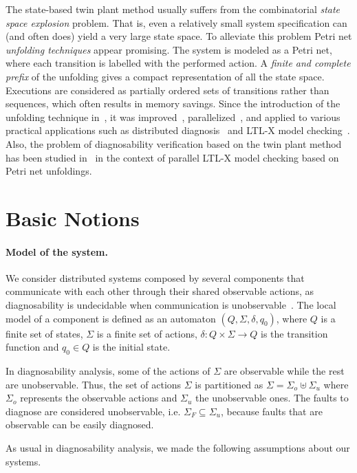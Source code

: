 \documentclass[a4paper]{article}
\begin{document}
The state-based twin plant method usually suffers from the combinatorial \emph{state space explosion} problem. That is, even a relatively small system specification can (and often does) yield a very large state space. To alleviate this problem Petri net \emph{unfolding techniques} appear promising. The system is modeled as a Petri net, where each transition is labelled with the performed action. A \emph{finite and complete prefix} of the unfolding gives a compact representation of all the state space. Executions are considered as partially ordered sets of transitions rather than sequences, which often results in memory savings. Since the introduction of the unfolding technique in~\cite{McMillan1992a}, it was improved~\cite{Esparza2002}, parallelized~\cite{Heljanko2002}, and applied to various practical applications such as distributed diagnosis~\cite{Fabre2005a} and LTL-X model checking~\cite{EH-01}. Also, the problem of diagnosability verification based on the twin plant method has been studied in~\cite{Madalinski2010} in the context of parallel LTL-X model checking based on Petri net unfoldings.

\section{Basic Notions} \label{sec:DDES}

\paragraph{Model of the system.}
We consider distributed systems composed by several components that communicate with each other through their shared observable actions, as diagnosability is undecidable when communication is unobservable~\cite{YeDagueValid}. The local model of a component is defined as an automaton $(Q,\Sigma,\delta,q_0)$, where $Q$ is a finite set of states, $\Sigma$ is a finite set of actions, $\delta : Q \times \Sigma \rightarrow Q$ is the transition function and $q_0 \in Q$ is the initial state.

In diagnosability analysis, some of the actions of $\Sigma$ are observable while the rest are unobservable. Thus, the set of actions $\Sigma$ is partitioned as $\Sigma=\Sigma_o\uplus \Sigma_u$ where $\Sigma_o$ represents the observable actions and $\Sigma_u$ the unobservable ones. The faults to diagnose are considered unobservable, i.e. $\Sigma_F \subseteq \Sigma_u$, because faults that are observable can be easily diagnosed.

As usual in diagnosability analysis, we made the following assumptions about our systems.
\end{document}
